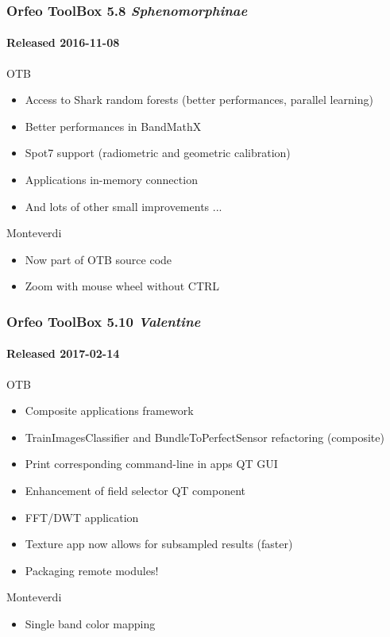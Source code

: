 \documentclass[smaller]{beamer}
\begin{document}
\begin{frame}
\frametitle{Orfeo ToolBox 5.8 \textit{Sphenomorphinae}}
\framesubtitle{Released 2016-11-08}
\begin{block}{OTB}
\begin{itemize}
\item Access to Shark random forests (better performances, parallel learning)
\item Better performances in BandMathX
\item Spot7 support (radiometric and geometric calibration)
\item Applications in-memory connection
\item And lots of other small improvements ...
\end{itemize}
\end{block}

\begin{block}{Monteverdi}
\begin{itemize}
\item Now part of OTB source code
\item Zoom with mouse wheel without CTRL
\end{itemize}
\end{block}
\end{frame}


\begin{frame}
\frametitle{Orfeo ToolBox 5.10 \textit{Valentine}}
\framesubtitle{Released 2017-02-14}
  \begin{block}{OTB}
    \begin{itemize}
      \item Composite applications framework
      \item TrainImagesClassifier and BundleToPerfectSensor refactoring (composite)
      \item Print corresponding command-line in apps QT GUI
      \item Enhancement of field selector QT component
      \item FFT/DWT application
      \item Texture app now allows for subsampled results (faster)
      \item Packaging remote modules!
    \end{itemize}
  \end{block}

  \begin{block}{Monteverdi}
    \begin{itemize}
      \item Single band color mapping
      \end{itemize}
  \end{block}

\end{frame}
\end{document}
